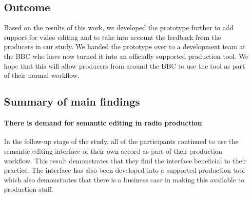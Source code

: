 






\subsection{Outcome}
Based on the results of this work, we developed the prototype further to add
support for video editing and to take into account the feedback from the
producers in our study.  We handed the prototype over to a development team at
the BBC who have now turned it into an officially supported production tool. We
hope that this will allow producers from around the BBC to use the tool as part
of their normal workflow.

\subsection{Summary of main findings}\label{sec:findings}


\paragraph{There is demand for semantic editing in radio production}
In the follow-up stage of the study, all of the participants continued to use
the semantic editing interface of their own accord as part of their production
workflow. This result demonstrates that they find the interface beneficial to
their practice. The interface has also been developed into a supported
production tool which also demonstrates that there is a business case in making
this available to production staff.

